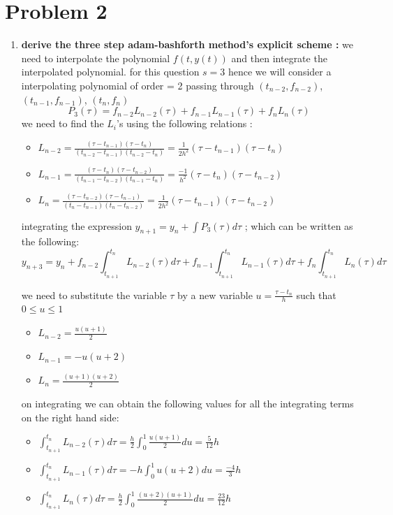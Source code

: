 \documentclass[12pt,letterpaper]{article}
\begin{document}
\section*{Problem 2}


\begin{enumerate}
  \item
  \textbf{derive the three step adam-bashforth method's explicit scheme :}
   \newline
   \newline
   we need to interpolate the polynomial $f(t, y(t))$ and then integrate the interpolated polynomial. for this question $s = 3$ hence we will consider a interpolating polynomial of order = 2 passing through $(t_{n-2}, f_{n-2})$, $(t_{n-1}, f_{n-1})$, $(t_{n}, f_{n})$
   \[P_3(\tau) = f_{n-2}L_{n-2}(\tau)+f_{n-1}L_{n-1}(\tau)+f_{n}L_{n}(\tau)\]
   we need to find the $L_i$'s using the following relations : 
   \begin{itemize}
       \item $L_{n-2} = \frac{(\tau - t_{n-1}) (\tau - t_{n})}{(t_{n-2}-t_{n-1})(t_{n-2}-t_{n})} = \frac{1}{2h^2}(\tau - t_{n-1}) (\tau - t_{n})$
       \item $L_{n-1} = \frac{(\tau - t_{n}) (\tau - t_{n-2})}{(t_{n-1}-t_{n-2})(t_{n-1}-t_{n})} = \frac{-1}{h^2}(\tau - t_{n}) (\tau - t_{n-2})$
       \item $L_{n} = \frac{(\tau - t_{n-2}) (\tau - t_{n-1})}{(t_{n}-t_{n-1})(t_{n}-t_{n-2})} = \frac{1}{2h^2}(\tau - t_{n-1}) (\tau - t_{n-2})$
   \end{itemize}
   integrating the expression $y_{n+1} = y_n + \int P_3(\tau) d\tau$ ; which can be written as the following: 
   \[y_{n+3} = y_n + f_{n-2}\int_{t_{n+1}}^{t_n} L_{n-2}(\tau)d\tau + f_{n-1}\int_{t_{n+1}}^{t_n} L_{n-1}(\tau)d\tau + f_{n}\int_{t_{n+1}}^{t_n} L_{n}(\tau)d\tau\]
   
   we need to substitute the variable $\tau$ by a new variable $u = \frac{\tau - t_n}{h} $ such that $0\leq u\leq 1$
   \begin{itemize}
       \item $L_{n-2} = \frac{u(u+1)}{2}$
       \item $L_{n-1} = -u(u+2)$
       \item $L_{n} = \frac{(u+1)(u+2)}{2}$
   \end{itemize}
   
   on integrating we can obtain the following values for all the integrating terms on the right hand side:
   \begin{itemize}
       \item $\int_{t_{n+1}}^{t_n} L_{n-2}(\tau)d\tau =  \frac{h}{2} \int_{0}^{1}\frac{u(u+1)}{2} du = \frac{5}{12}h$
       \item $\int_{t_{n+1}}^{t_n} L_{n-1}(\tau)d\tau =  -h \int_{0}^{1} u(u+2) du = \frac{-4}{3}h$
       \item $\int_{t_{n+1}}^{t_n} L_{n}(\tau)d\tau =  \frac{h}{2} \int_{0}^{1}\frac{(u+2)(u+1)}{2} du= \frac{23}{12}h$
   \end{itemize}
   

\end{enumerate}
\end{document}
